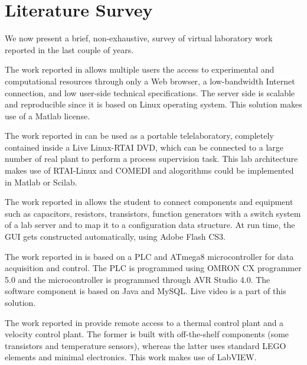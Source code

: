 \section{Literature Survey}
\label{sec:litsurvey}
We now present a brief, non-exhaustive, survey of virtual laboratory
work reported in the last couple of years.


The work reported in \cite{carlos} allows multiple users the access to
experimental and computational resources through only a Web browser, a
low-bandwidth Internet connection, and low user-side technical
specifications.  The server side is scalable and reproducible since it
is based on Linux operating system.  This solution makes use of a
Matlab license.   

The work reported in
\cite{aldo} can be used as a portable telelaboratory, completely
contained inside a Live Linux-RTAI DVD, which can be connected to a
large number of real plant to perform a process supervision task. 
This lab architecture makes use of RTAI-Linux and COMEDI and
alogorithms could be implemented in Matlab or Scilab.  

The work reported in \cite{odeh} allows the student to connect
components and equipment such as capacitors, resistors, transistors,
function generators with a switch system of a lab server and to map it
to a configuration data structure.  At run time, the GUI gets
constructed automatically, using Adobe Flash CS3.

The work reported in \cite{gabriel} is based on a PLC and ATmega8
microcontroller for data acquisition and control.  
The PLC is programmed using OMRON CX programmer 5.0 and the
microcontroller is programmed through AVR Studio 4.0.  The software
component is based on Java and MySQL.  Live video is a part of this
solution. 

The work reported in \cite{alberto} provide remote access to a
thermal control plant and a velocity control plant.  The former is
built with off-the-shelf components (some transistors and temperature
sensors), whereas the latter uses standard LEGO elements and minimal
electronics.  This work makes use of LabVIEW.


